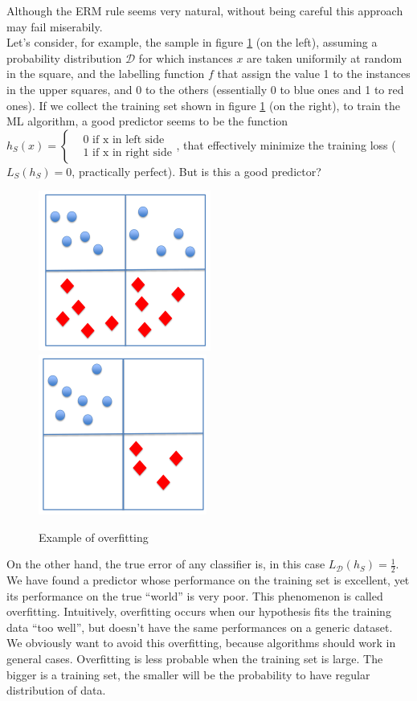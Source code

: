 \documentclass[12pt]{report}
\theoremstyle{plain}
\newcommand\mcl[1]{\mathcal{#1}}
\begin{document}
\begin{flushleft}
\vspace{0.5cm}
Although the ERM rule seems very natural, without being careful this approach may fail miserabily.\\
Let's consider, for example, the sample in figure \ref{fig:overfit} (on the left), assuming a probability distribution $\mcl{D}$ for which instances $x$ are taken uniformily at random in the square, and the labelling function $f$ that assign the value 1 to the instances in the upper squares, and 0 to the others (essentially 0 to blue ones and 1 to red ones). If we collect the training set shown in figure \ref{fig:overfit} (on the right), to train the ML algorithm, a good predictor seems to be the function $h_S(x) = \left\{\begin{aligned} &0 \text{ if x in left side}\\ &1 \text{ if x in right side}\end{aligned}\right.$, that effectively minimize the training loss ($L_S(h_S) =0$, practically perfect). But is this a good predictor?

\begin{figure}[hbtp]
\centering
\includegraphics[scale=1.5]{images/overfit_ex_1.pdf}\qquad\qquad
\includegraphics[scale=1.5]{images/overfit_ex_2.pdf}
\caption{Example of overfitting}
\label{fig:overfit}
\end{figure}

On the other hand, the true error of any classifier is, in this case $L_\mcl{D}(h_S) = \frac{1}{2}$.\\
We have found a predictor whose performance on the training set is excellent, yet its performance on the true “world” is very poor. This phenomenon is called overfitting. Intuitively, overfitting occurs when our hypothesis fits the training data “too well”, but doesn't have the same performances on a generic dataset. We obviously want to avoid this overfitting, because algorithms should work in general cases. Overfitting is less probable when the training set is large. The bigger is a training set, the smaller will be the probability to have regular distribution of data.\\



\end{flushleft}
\end{document}
